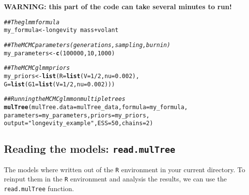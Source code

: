\documentclass{article}\usepackage[]{graphicx}\usepackage[]{color}
\makeatletter
\newcommand{\hlnum}[1]{\textcolor[rgb]{0.686,0.059,0.569}{#1}}%
\newcommand{\hlstr}[1]{\textcolor[rgb]{0.192,0.494,0.8}{#1}}%
\newcommand{\hlcom}[1]{\textcolor[rgb]{0.678,0.584,0.686}{\textit{#1}}}%
\newcommand{\hlopt}[1]{\textcolor[rgb]{0,0,0}{#1}}%
\newcommand{\hlstd}[1]{\textcolor[rgb]{0.345,0.345,0.345}{#1}}%
\newcommand{\hlkwb}[1]{\textcolor[rgb]{0.69,0.353,0.396}{#1}}%
\newcommand{\hlkwc}[1]{\textcolor[rgb]{0.333,0.667,0.333}{#1}}%
\newcommand{\hlkwd}[1]{\textcolor[rgb]{0.737,0.353,0.396}{\textbf{#1}}}%
\newenvironment{kframe}{%
 \def\at@end@of@kframe{}%
 \ifinner\ifhmode%
  \def\at@end@of@kframe{\end{minipage}}%
  \begin{minipage}{\columnwidth}%
 \fi\fi%
 \def\FrameCommand##1{\hskip\@totalleftmargin \hskip-\fboxsep
 \colorbox{shadecolor}{##1}\hskip-\fboxsep
     \hskip-\linewidth \hskip-\@totalleftmargin \hskip\columnwidth}%
 \MakeFramed {\advance\hsize-\width
   \@totalleftmargin\z@ \linewidth\hsize
   \@setminipage}}%
 {\par\unskip\endMakeFramed%
 \at@end@of@kframe}
\newenvironment{knitrout}{}{} %
\makeatother
\begin{document}
\textbf{WARNING: this part of the code can take several minutes to run!}
\begin{knitrout}
\color{fgcolor}\begin{kframe}
\begin{alltt}
\hlcom{## The glmm formula}
\hlstd{my_formula} \hlkwb{<-} \hlstd{longevity} \hlopt{~} \hlstd{mass} \hlopt{+} \hlstd{volant}

\hlcom{## The MCMC parameters (generations, sampling, burnin)}
\hlstd{my_parameters} \hlkwb{<-} \hlkwd{c}\hlstd{(}\hlnum{100000}\hlstd{,} \hlnum{10}\hlstd{,} \hlnum{1000}\hlstd{)}

\hlcom{## The MCMCglmm priors}
\hlstd{my_priors} \hlkwb{<-} \hlkwd{list}\hlstd{(}\hlkwc{R} \hlstd{=} \hlkwd{list}\hlstd{(}\hlkwc{V} \hlstd{=} \hlnum{1}\hlopt{/}\hlnum{2}\hlstd{,} \hlkwc{nu} \hlstd{=} \hlnum{0.002}\hlstd{),}
    \hlkwc{G} \hlstd{=} \hlkwd{list}\hlstd{(}\hlkwc{G1} \hlstd{=} \hlkwd{list}\hlstd{(}\hlkwc{V} \hlstd{=} \hlnum{1}\hlopt{/}\hlnum{2}\hlstd{,} \hlkwc{nu} \hlstd{=} \hlnum{0.002}\hlstd{)))}

\hlcom{## Running the MCMCglmm on multiple trees}
\hlkwd{mulTree}\hlstd{(}\hlkwc{mulTree.data} \hlstd{= mulTree_data,} \hlkwc{formula} \hlstd{= my_formula,}
    \hlkwc{parameters} \hlstd{= my_parameters,} \hlkwc{priors} \hlstd{= my_priors,}
    \hlkwc{output} \hlstd{=} \hlstr{"longevity_example"}\hlstd{,} \hlkwc{ESS} \hlstd{=} \hlnum{50}\hlstd{,} \hlkwc{chains} \hlstd{=} \hlnum{2}\hlstd{)}
\end{alltt}


{\ttfamily\noindent\bfseries\color{errorcolor}{\#\# Error in as.vector(data): no method for coercing this S4 class to a vector}}\end{kframe}
\end{knitrout}

\subsection{Reading the models: \texttt{read.mulTree}}
The models where written out of the \texttt{R} environment in your current directory.
To reinput them in the \texttt{R} environment and analysis the results, we can use the \texttt{read.mulTree} function.
\end{document}
